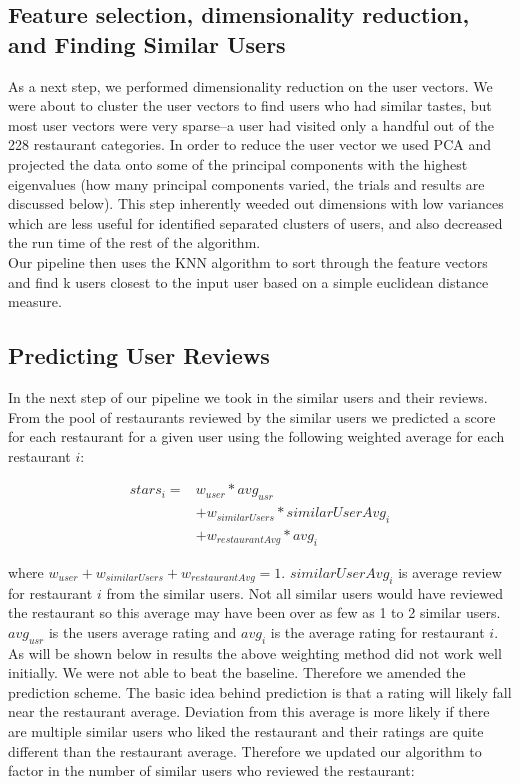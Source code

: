 \documentclass[10pt,twocolumn,letterpaper]{article}
\newcommand{\wu}{\ensuremath{w_{user}}}
\newcommand{\ws}{\ensuremath{w_{similarUsers}}}
\newcommand{\wrst}{\ensuremath{w_{restaurantAvg}}}
\begin{document}
\subsection{Feature selection, dimensionality reduction, and Finding Similar Users}
As a next step, we performed dimensionality reduction on the user vectors. We were about to cluster the user vectors to find users who had similar tastes, but most user vectors were very sparse--a user had visited only a handful out of the 228 restaurant categories. In order to reduce the user vector we used PCA and projected the data onto some of the principal components with the highest eigenvalues (how many principal components varied, the trials and results are discussed below). This step inherently weeded out dimensions with low variances which are less useful for identified separated clusters of users, and also decreased the run time of the rest of the algorithm.\\
\indent Our pipeline then uses the KNN algorithm to sort through the feature vectors and find k users closest to the input user based on a simple euclidean distance measure. 

\subsection{Predicting User Reviews}
In the next step of our pipeline we took in the similar users and their reviews. From the pool of restaurants reviewed by the similar users we predicted a score for each restaurant for a given user using the following weighted average for each restaurant $i$:

\begin{align*}
stars_{i} = & \wu * avg_{usr}\\
&+ \ws * similarUserAvg_{i}\\
&+ \wrst * avg_{i}
\end{align*}

 where $\wu + \ws + \wrst = 1$. $similarUserAvg_i$ is average review for restaurant $i$ from the similar users. Not all similar users would have reviewed the restaurant so this average may have been over as few as 1 to 2 similar users. $avg_{usr}$ is the users average rating and $avg_{i}$ is the average rating for restaurant $i$.
\\[0.5em]
\indent As will be shown below in results the above weighting method did not work well initially. We were not able to beat the baseline. Therefore we amended the prediction scheme. The basic idea behind prediction is that a rating will likely fall near the restaurant average. Deviation from this average is more likely if there are multiple similar users who liked the restaurant and their ratings are quite different than the restaurant average. Therefore we updated our algorithm to factor in the number of similar users who reviewed the restaurant:\\[1em]
\end{document}

